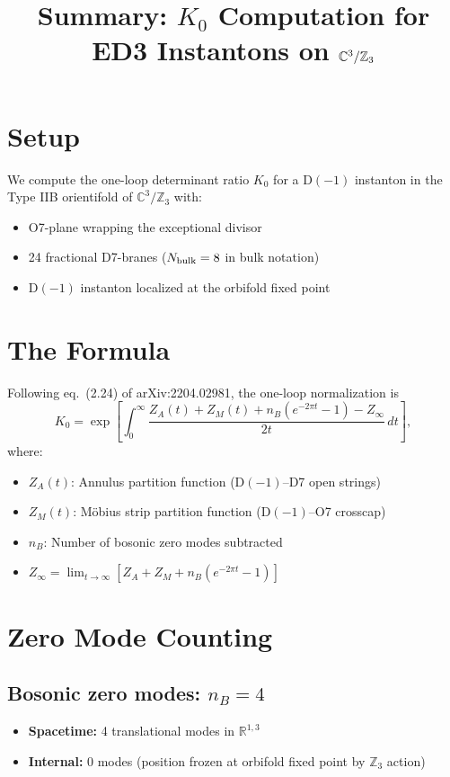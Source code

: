 \documentclass[11pt]{article}
\title{Summary: $K_0$ Computation for ED3 Instantons on $\C^3/\Z_3$}
\author{}
\date{}
\newcommand{\C}{\mathbb{C}}
\newcommand{\R}{\mathbb{R}}
\newcommand{\Z}{\mathbb{Z}}
\begin{document}
\maketitle

\section{Setup}

We compute the one-loop determinant ratio $K_0$ for a D$(-1)$ instanton in the Type IIB orientifold of $\C^3/\Z_3$ with:
\begin{itemize}
\item O7-plane wrapping the exceptional divisor
\item 24 fractional D7-branes ($N_{\rm bulk} = 8$ in bulk notation)
\item D$(-1)$ instanton localized at the orbifold fixed point
\end{itemize}

\section{The Formula}

Following eq.~(2.24) of arXiv:2204.02981, the one-loop normalization is
\begin{equation}
K_0 = \exp\left[\int_0^\infty \frac{Z_A(t) + Z_M(t) + n_B(e^{-2\pi t} - 1) - Z_\infty}{2t}\, dt\right],
\end{equation}
where:
\begin{itemize}
\item $Z_A(t)$: Annulus partition function (D$(-1)$--D7 open strings)
\item $Z_M(t)$: M\"obius strip partition function (D$(-1)$--O7 crosscap)
\item $n_B$: Number of bosonic zero modes subtracted
\item $Z_\infty = \lim_{t\to\infty}[Z_A + Z_M + n_B(e^{-2\pi t} - 1)]$
\end{itemize}

\section{Zero Mode Counting}

\subsection{Bosonic zero modes: $n_B = 4$}
\begin{itemize}
\item \textbf{Spacetime:} 4 translational modes in $\R^{1,3}$
\item \textbf{Internal:} 0 modes (position frozen at orbifold fixed point by $\Z_3$ action)
\end{itemize}
\end{document}
